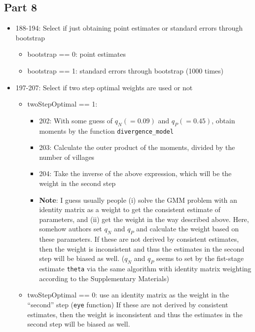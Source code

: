 \documentclass[10pt,letterpaper]{article}
\begin{document}
\subsection*{Part 8}
\begin{itemize}
  \item 188-194: Select if just obtaining point estimates or standard errors through bootstrap
    \begin{itemize}
      \item bootstrap == 0: point estimates
      \item bootstrap == 1: standard errors through bootstrap (1000 times)
    \end{itemize}
  \item 197-207: Select if two step optimal weights are used or not
    \begin{itemize}
      \item twoStepOptimal == 1: 
        \begin{itemize}
          \item 202: With some guess of $q_N (= 0.09)$ and $q_P (= 0.45)$, obtain moments by the function \texttt{divergence\_model}
          \item 203: Calculate the outer product of the moments, divided by the number of villages
          \item 204: Take the inverse of the above expression, which will be the weight in the second step
          \item \textbf{Note}: I guess usually people 
            (i) solve the GMM problem with an identity matrix as a weight to get the consistent estimate of parameters, and 
            (ii) get the weight in the way described above.
            Here, somehow authors set $q_N$ and $q_P$ and calculate the weight based on these parameters.
            If these are not derived by consistent estimates, then the weight is inconsistent and thus the estimates in the second step will be biased as well. ($q_N$ and $q_P$ seems to set by the fist-stage estimate \texttt{theta} via the same algorithm with identity matrix weighting according to the Supplementary Materials)
        \end{itemize}
      \item twoStepOptimal == 0: use an identity matrix as the weight in the ``second'' step (\texttt{eye} function)
            If these are not derived by consistent estimates, then the weight is inconsistent and thus the estimates in the second step will be biased as well.
    \end{itemize}

\end{itemize}
\end{document}
